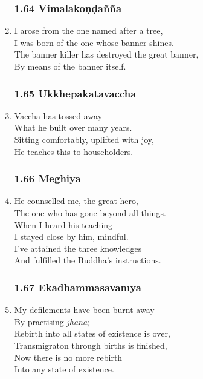 \documentclass[10pt, openany]{book}
\begin{document}
\begin{enumerate}
\subsubsection*{1.64 Vimalakoṇḍañña}

\item I arose from the one named after a tree,\\
I was born of the one whose banner shines.\\
The banner killer has destroyed the great banner,\\
By means of the banner itself.

\subsubsection*{1.65 Ukkhepakatavaccha}

\item Vaccha has tossed away\\
What he built over many years.\\
Sitting comfortably, uplifted with joy,\\
He teaches this to householders.

\subsubsection*{1.66 Meghiya}

\item He counselled me, the great hero,\\
The one who has gone beyond all things.\\
When I heard his teaching \\
I stayed close by him, mindful.\\
I’ve attained the three knowledges\\
And fulfilled the Buddha’s instructions.

\subsubsection*{1.67 Ekadhammasavanīya}

\item My defilements have been burnt away \\
By practising \emph{jhāna};\\
Rebirth into all states of existence is over,\\
Transmigraton through births is finished,\\
Now there is no more rebirth \\
Into any state of existence.


\end{enumerate}
\end{document}
